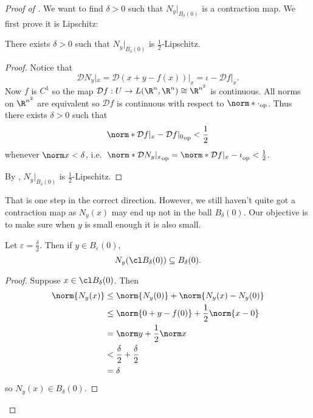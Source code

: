 \documentclass[a4paper]{article}
\newcommand*{\D}{\mathcal{D}}
\newcommand*{\nop}[1]{\norm*{#1}_{\text{op}}}
\theoremstyle{definition}
\begin{document}
\begin{proof}[Proof of ]
  We want to find \(\delta > 0\) such that \(N_y|_{B_\delta(0)}\) is a contraction map. We first prove it is Lipschitz:

  \begin{lemma}
    There exists \(\delta > 0\) such that \(N_y|_{B_\delta(0)}\) is \(\frac{1}{2}\)-Lipschitz.
  \end{lemma}

  \begin{proof}
    Notice that
    \[
      \D N_y|_x = \D (x + y - f(x))|_x = \iota - \D f|_x.
    \]
    Now \(f\) is \(C^1\) so the map \(\D f: U \to L(\R^n, \R^n) \cong \R^{n^2}\) is continuous. All norms on \(\R^{n^2}\) are equivalent so \(\D f\) is continuous with respect to \(\nop \cdot\). Thus there exists \(\delta > 0\) such that
    \[
      \nop{\D f|_x - \D f|_0} < \frac{1}{2}
    \]
    whenever \(\norm x < \delta\), i.e.\ \(\nop{\D N_y|_x} = \nop{\D f|_x - \iota} < \frac{1}{2}\).

    By , \(N_y|_{B_\delta(0)}\) is \(\frac{1}{2}\)-Lipschitz.
  \end{proof}

  That is one step in the correct direction. However, we still haven't quite got a contraction map as \(N_y(x)\) may end up not in the ball \(B_\delta(0)\). Our objective is to make sure when \(y\) is small enough it is also small.

  \begin{lemma}
    Let \(\varepsilon = \frac{\delta}{2}\). Then if \(y \in B_\varepsilon(0)\),
    \[
      N_y(\cl B_\delta(0)) \subseteq B_\delta(0).
    \]
  \end{lemma}

  \begin{proof}
    Suppose \(x \in \cl B_\delta(0)\). Then
    \begin{align*}
      \norm{N_y(x)} &\leq \norm{N_y(0)} + \norm{N_y(x) - N_y(0)} \\
                    &\leq \norm{0 + y -f(0)} + \frac{1}{2} \norm{x - 0} \\
                    &= \norm y + \frac{1}{2} \norm x \\
                    &< \frac{\delta}{2} + \frac{\delta}{2} \\
                    &= \delta
    \end{align*}
    so \(N_y(x) \in B_\delta(0)\).
  \end{proof}


\end{proof}
\end{document}
